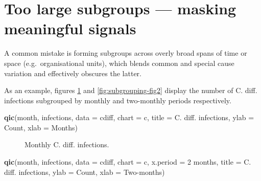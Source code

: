 \documentclass[
]{book}
\makeatletter
\newenvironment{Shaded}{\begin{snugshade}}{\end{snugshade}}
\newcommand{\AttributeTok}[1]{\textcolor[rgb]{0.13,0.29,0.53}{#1}}
\newcommand{\FunctionTok}[1]{\textcolor[rgb]{0.13,0.29,0.53}{\textbf{#1}}}
\newcommand{\NormalTok}[1]{#1}
\newcommand{\StringTok}[1]{\textcolor[rgb]{0.31,0.60,0.02}{#1}}
\newcommand*\pandocbounded[1]{%
  \sbox\pandoc@box{#1}%
  \Gscale@div\@tempa{\textheight}{\dimexpr\ht\pandoc@box+\dp\pandoc@box\relax}%
  \Gscale@div\@tempb{\linewidth}{\wd\pandoc@box}%
  \ifdim\@tempb\p@<\@tempa\p@\let\@tempa\@tempb\fi%
  \ifdim\@tempa\p@<\p@\scalebox{\@tempa}{\usebox\pandoc@box}%
  \else\usebox{\pandoc@box}%
  \fi%
}
\makeatother
\begin{document}
\section{Too large subgroups --- masking meaningful signals}\label{too-large-subgroups-masking-meaningful-signals}

A common mistake is forming subgroups across overly broad spans of time or space (e.g.~organisational units), which blends common and special cause variation and effectively obscures the latter.

As an example, figures \ref{fig:subgrouping-fig1} and \ref{fig:subgrouping-fig2} display the number of C. diff. infections subgrouped by monthly and two-monthly periods respectively.

\begin{Shaded}
\begin{Highlighting}[]
\FunctionTok{qic}\NormalTok{(month, infections, }
    \AttributeTok{data  =}\NormalTok{ cdiff, }
    \AttributeTok{chart =} \StringTok{\textquotesingle{}c\textquotesingle{}}\NormalTok{,}
    \AttributeTok{title =} \StringTok{\textquotesingle{}C. diff. infections\textquotesingle{}}\NormalTok{,}
    \AttributeTok{ylab  =} \StringTok{\textquotesingle{}Count\textquotesingle{}}\NormalTok{,}
    \AttributeTok{xlab  =} \StringTok{\textquotesingle{}Months\textquotesingle{}}\NormalTok{)}
\end{Highlighting}
\end{Shaded}

\begin{figure}
\centering
\pandocbounded{}
\caption{\label{fig:subgrouping-fig1}Monthly C. diff. infections.}
\end{figure}

\begin{Shaded}
\begin{Highlighting}[]
\FunctionTok{qic}\NormalTok{(month, infections, }
    \AttributeTok{data     =}\NormalTok{ cdiff, }
    \AttributeTok{chart    =} \StringTok{\textquotesingle{}c\textquotesingle{}}\NormalTok{,}
    \AttributeTok{x.period =} \StringTok{\textquotesingle{}2 months\textquotesingle{}}\NormalTok{,}
    \AttributeTok{title    =} \StringTok{\textquotesingle{}C. diff. infections\textquotesingle{}}\NormalTok{,}
    \AttributeTok{ylab     =} \StringTok{\textquotesingle{}Count\textquotesingle{}}\NormalTok{,}
    \AttributeTok{xlab     =} \StringTok{\textquotesingle{}Two{-}months\textquotesingle{}}\NormalTok{)}
\end{Highlighting}
\end{Shaded}
\end{document}
